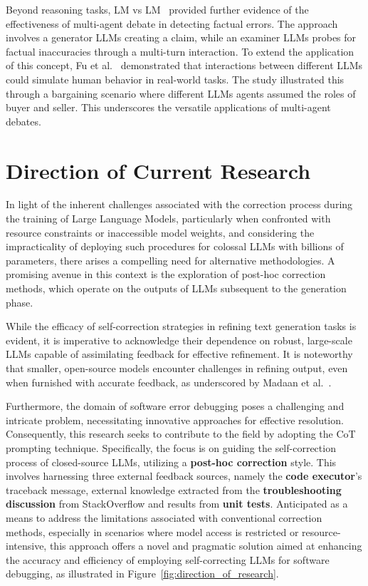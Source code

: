 \documentclass[a4paper,oneside]{book}
\begin{document}
Beyond reasoning tasks, LM vs LM~\cite{cohen2023lm} provided further evidence of the effectiveness of multi-agent debate in detecting factual errors. The approach involves a generator LLMs creating a claim, while an examiner LLMs probes for factual inaccuracies through a multi-turn interaction. To extend the application of this concept, Fu et al.~\cite{fu2023improving} demonstrated that interactions between different LLMs could simulate human behavior in real-world tasks. The study illustrated this through a bargaining scenario where different LLMs agents assumed the roles of buyer and seller. This underscores the versatile applications of multi-agent debates.

\section{Direction of Current Research}
In light of the inherent challenges associated with the correction process during the training of Large Language Models, particularly when confronted with resource constraints or inaccessible model weights, and considering the impracticality of deploying such procedures for colossal LLMs with billions of parameters, there arises a compelling need for alternative methodologies. A promising avenue in this context is the exploration of post-hoc correction methods, which operate on the outputs of LLMs subsequent to the generation phase.

While the efficacy of self-correction strategies in refining text generation tasks is evident, it is imperative to acknowledge their dependence on robust, large-scale LLMs capable of assimilating feedback for effective refinement. It is noteworthy that smaller, open-source models encounter challenges in refining output, even when furnished with accurate feedback, as underscored by Madaan et al.~\cite{madaan2023selfrefine}.

Furthermore, the domain of software error debugging poses a challenging and intricate problem, necessitating innovative approaches for effective resolution. Consequently, this research seeks to contribute to the field by adopting the CoT prompting technique. Specifically, the focus is on guiding the self-correction process of closed-source LLMs, utilizing a \textbf{post-hoc correction} style. This involves harnessing three external feedback sources, namely the \textbf{code executor}'s traceback message, external knowledge extracted from the \textbf{troubleshooting discussion} from StackOverflow and results from \textbf{unit tests}. Anticipated as a means to address the limitations associated with conventional correction methods, especially in scenarios where model access is restricted or resource-intensive, this approach offers a novel and pragmatic solution aimed at enhancing the accuracy and efficiency of employing self-correcting LLMs for software debugging, as illustrated in Figure~\ref{fig:direction_of_research}.
\end{document}
